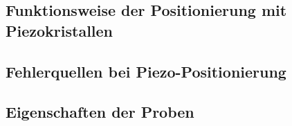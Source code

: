 \subsection{Funktionsweise der Positionierung mit Piezokristallen}
\label{sec:Piezokristalle}

\subsection{Fehlerquellen bei Piezo-Positionierung}
\label{Fehlerquellen}

\subsection{Eigenschaften der Proben}
\label{EigenschaftenProben}



